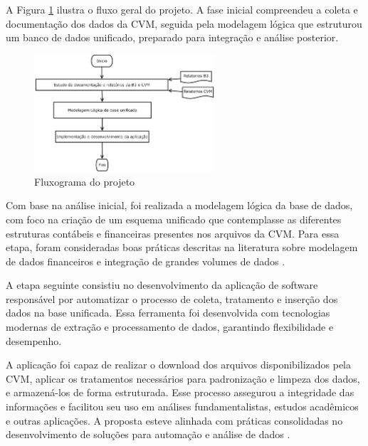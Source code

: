 A Figura \ref{fig:fluxograma} ilustra o fluxo geral do projeto. A fase inicial compreendeu a coleta e documentação dos dados da CVM, seguida pela modelagem lógica que estruturou um banco de dados unificado, preparado para integração e análise posterior.

\begin{figure}[!htb] \centering
	\caption{Fluxograma do projeto} \label{fig:fluxograma}
	\begin{varwidth}{\linewidth}
		\includegraphics[width=0.6\textwidth]{figuras/fluxograma - v3.pdf}
	\end{varwidth}
\end{figure}

Com base na análise inicial, foi realizada a modelagem lógica da base de dados, com foco na criação de um esquema unificado que contemplasse as diferentes estruturas contábeis e financeiras presentes nos arquivos da CVM. Para essa etapa, foram consideradas boas práticas descritas na literatura sobre modelagem de dados financeiros \cite{domingues:2020:modelagem} e integração de grandes volumes de dados \cite{perlin:2021:analise}.

A etapa seguinte consistiu no desenvolvimento da aplicação de software responsável por automatizar o processo de coleta, tratamento e inserção dos dados na base unificada. Essa ferramenta foi desenvolvida com tecnologias modernas de extração e processamento de dados, garantindo flexibilidade e desempenho.

A aplicação foi capaz de realizar o download dos arquivos disponibilizados pela CVM, aplicar os tratamentos necessários para padronização e limpeza dos dados, e armazená-los de forma estruturada. Esse processo assegurou a integridade das informações e facilitou seu uso em análises fundamentalistas, estudos acadêmicos e outras aplicações. A proposta esteve alinhada com práticas consolidadas no desenvolvimento de soluções para automação e análise de dados \cite{prikladnicki:2014:desenvolvimentosoftware} \cite{nhimi:2016:desenvolvimentosoftware}.


